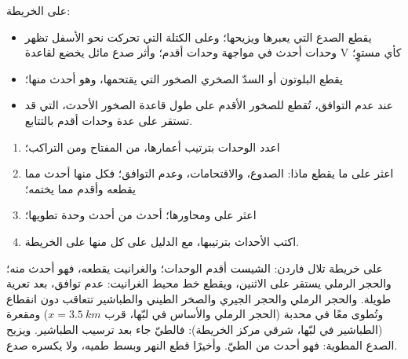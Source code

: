 \begin{proposition}\label{prop:b1:geological-maps:cuts}
على الخريطة:
\begin{itemize}
  \item يقطع الصدع  التي يعبرها ويزيحها؛ وعلى الكتلة التي تحركت نحو الأسفل تظهر وحدات أحدث في مواجهة وحدات أقدم؛ وأثر صدع مائل يخضع لقاعدة V كأي مستوٍ؛
  \item يقطع البلوتون أو السدّ الصخري  الصخور التي يقتحمها، وهو أحدث منها؛
  \item عند عدم التوافق، تُقطع  للصخور الأقدم على طول قاعدة الصخور الأحدث، التي قد تستقر على عدة وحدات أقدم بالتتابع.
\end{itemize}
\end{proposition}

\begin{method}\label{met:b1:geological-maps:history}
\begin{enumerate}
  \item اعدد الوحدات بترتيب أعمارها، من المفتاح ومن التراكب؛
  \item اعثر على ما يقطع ماذا: الصدوع، والاقتحامات، وعدم التوافق؛ فكل منها أحدث مما يقطعه وأقدم مما يختمه؛
  \item اعثر على  ومحاورها؛  أحدث من أحدث وحدة تطويها؛
  \item اكتب الأحداث بترتيبها، مع الدليل على كل منها على الخريطة.
\end{enumerate}
\end{method}

\begin{example}\label{ex:b1:geological-maps:history}
على خريطة تلال فاردن: الشيست أقدم الوحدات؛ والغرانيت يقطعه، فهو أحدث منه؛ والحجر الرملي يستقر على الاثنين، ويقطع خط محيط الغرانيت: عدم توافق، بعد تعرية طويلة. والحجر الرملي والحجر الجيري والصخر الطيني والطباشير تتعاقب دون انقطاع وتُطوى معًا في  محدبة (الحجر الرملي والأساس في لبّها، قرب $x = \qty{3.5}{km}$) ومقعرة (الطباشير في لبّها، شرقي مركز الخريطة): فالطيّ جاء بعد ترسيب الطباشير. ويزيح الصدع  المطوية: فهو أحدث من الطيّ. وأخيرًا قطع النهر وبسط طميه، ولا يكسره صدع.
\end{example}

